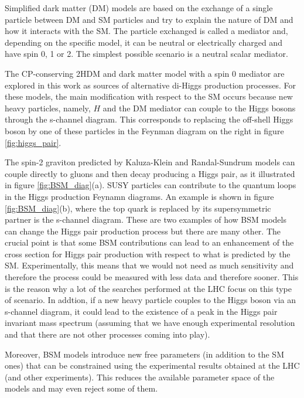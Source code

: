 Simplified dark matter (DM) models are based on the exchange of a single particle between DM and SM particles and try to explain the nature of DM and how it interacts with the SM. The particle exchanged is called a mediator and, depending on the specific model, it can be neutral or electrically charged and have spin 0, 1 or 2. The simplest possible scenario is a neutral scalar mediator.

The CP-conserving 2HDM and dark matter model with a spin 0 mediator are explored in this work as sources of alternative di-Higgs production processes. For these models, the main modification with respect to the SM occurs because new heavy particles, namely, $H$ and the DM mediator can couple to the Higgs bosons through the s-channel diagram. This corresponds to replacing the off-shell Higgs boson by one of these particles in the Feynman diagram on the right in figure \ref{fig:higgs_pair}.

The spin-2 graviton predicted by Kaluza-Klein and Randal-Sundrum models can couple directly to gluons and then decay producing a Higgs pair, as it illustrated in figure \ref{fig:BSM_diag}(a). SUSY particles can contribute to the quantum loops in the Higgs production Feynamn diagrams. An example is shown in figure \ref{fig:BSM_diag}(b), where the top quark is replaced by its supersymmetric partner is the s-channel diagram. These are two examples of how BSM models can change the Higgs pair production process but there are many other. The crucial point is that some BSM contributions can lead to an enhancement of the cross section for Higgs pair production with respect to what is predicted by the SM. Experimentally, this means that we would not need as much sensitivity and therefore the process could be measured with less data and therefore sooner. This is the reason why a lot of the searches performed at the LHC focus on this type of scenario. In addtion, if a new heavy particle couples to the Higgs boson via an s-channel diagram, it could lead to the existence of a peak in the Higgs pair invariant mass spectrum (assuming that we have enough experimental resolution and that there are not other processes coming into play). 

Moreover, BSM models introduce new free parameters (in addition to the SM ones) that can be constrained using the experimental results obtained at the LHC (and other experiments). This reduces the available parameter space of the models and may even reject some of them.

